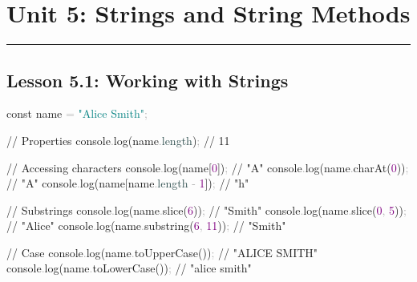 \documentclass[
  justified,
  openright,
]{tufte-book}
\newcommand{\AttributeTok}[1]{\textcolor{DarkSlateGray}{#1}}
\newcommand{\BuiltInTok}[1]{#1}
\newcommand{\CommentTok}[1]{\textcolor{MidGray}{#1}}
\newcommand{\DecValTok}[1]{\textcolor{Purple}{#1}}
\newcommand{\FunctionTok}[1]{\textcolor{BrandBlue}{#1}}
\newcommand{\KeywordTok}[1]{\textcolor{BrandBlue}{#1}}
\newcommand{\NormalTok}[1]{#1}
\newcommand{\OperatorTok}[1]{\textcolor{DarkGray}{#1}}
\newcommand{\StringTok}[1]{\textcolor{Teal}{#1}}
\newenvironment{Shaded}{%
  \begin{snugshade}
}{%
  \end{snugshade}
}
\begin{document}
\newpage

\section{Unit 5: Strings and String
Methods}\label{unit-5-strings-and-string-methods}

\begin{center}\rule{0.5\linewidth}{0.5pt}\end{center}

\subsection{Lesson 5.1: Working with
Strings}\label{lesson-5.1-working-with-strings}

\begin{Shaded}
\begin{Highlighting}[]
\KeywordTok{const}\NormalTok{ name }\OperatorTok{=} \StringTok{"Alice Smith"}\OperatorTok{;}

\CommentTok{// Properties}
\BuiltInTok{console}\OperatorTok{.}\FunctionTok{log}\NormalTok{(name}\OperatorTok{.}\AttributeTok{length}\NormalTok{)}\OperatorTok{;} \CommentTok{// 11}

\CommentTok{// Accessing characters}
\BuiltInTok{console}\OperatorTok{.}\FunctionTok{log}\NormalTok{(name[}\DecValTok{0}\NormalTok{])}\OperatorTok{;} \CommentTok{// "A"}
\BuiltInTok{console}\OperatorTok{.}\FunctionTok{log}\NormalTok{(name}\OperatorTok{.}\FunctionTok{charAt}\NormalTok{(}\DecValTok{0}\NormalTok{))}\OperatorTok{;} \CommentTok{// "A"}
\BuiltInTok{console}\OperatorTok{.}\FunctionTok{log}\NormalTok{(name[name}\OperatorTok{.}\AttributeTok{length} \OperatorTok{{-}} \DecValTok{1}\NormalTok{])}\OperatorTok{;} \CommentTok{// "h"}

\CommentTok{// Substrings}
\BuiltInTok{console}\OperatorTok{.}\FunctionTok{log}\NormalTok{(name}\OperatorTok{.}\FunctionTok{slice}\NormalTok{(}\DecValTok{6}\NormalTok{))}\OperatorTok{;} \CommentTok{// "Smith"}
\BuiltInTok{console}\OperatorTok{.}\FunctionTok{log}\NormalTok{(name}\OperatorTok{.}\FunctionTok{slice}\NormalTok{(}\DecValTok{0}\OperatorTok{,} \DecValTok{5}\NormalTok{))}\OperatorTok{;} \CommentTok{// "Alice"}
\BuiltInTok{console}\OperatorTok{.}\FunctionTok{log}\NormalTok{(name}\OperatorTok{.}\FunctionTok{substring}\NormalTok{(}\DecValTok{6}\OperatorTok{,} \DecValTok{11}\NormalTok{))}\OperatorTok{;} \CommentTok{// "Smith"}

\CommentTok{// Case}
\BuiltInTok{console}\OperatorTok{.}\FunctionTok{log}\NormalTok{(name}\OperatorTok{.}\FunctionTok{toUpperCase}\NormalTok{())}\OperatorTok{;} \CommentTok{// "ALICE SMITH"}
\BuiltInTok{console}\OperatorTok{.}\FunctionTok{log}\NormalTok{(name}\OperatorTok{.}\FunctionTok{toLowerCase}\NormalTok{())}\OperatorTok{;} \CommentTok{// "alice smith"}


\end{Highlighting}
\end{Shaded}
\end{document}
